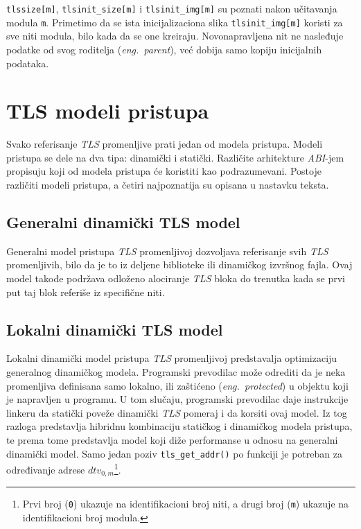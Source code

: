 \documentclass[12pt,oneside]{memoir}
\begin{document}
\texttt{tlssize[m]}, \texttt{tlsinit\_size[m]} i \texttt{tlsinit\_img[m]} su poznati nakon učitavanja modula \texttt{m}. Primetimo da se ista inicijalizaciona slika \texttt{tlsinit\_img[m]} koristi za sve niti modula, bilo kada da se one kreiraju. Novonapravljena nit ne nasleđuje podatke od svog roditelja (\emph{eng.~parent}), već dobija samo kopiju inicijalnih podataka.

\section{TLS modeli pristupa}
\label{sec:tlsmodeli}

Svako referisanje \emph{TLS} promenljive prati jedan od modela pristupa. Modeli pristupa se dele na dva tipa: dinamički i statički. Različite arhitekture \emph{ABI}-jem propisuju koji od modela pristupa će koristiti kao podrazumevani. Postoje različiti modeli pristupa, a četiri najpoznatija su opisana u nastavku teksta.

\subsection{Generalni dinamički TLS model}

Generalni model pristupa \emph{TLS} promenljivoj dozvoljava referisanje svih \emph{TLS} promenljivih, bilo da je to iz deljene biblioteke ili dinamičkog izvršnog fajla. Ovaj model takođe podržava odloženo alociranje \emph{TLS} bloka do trenutka kada se prvi put taj blok referiše iz specifične niti.

\subsection{Lokalni dinamički TLS model}

Lokalni dinamički model pristupa \emph{TLS} promenljivoj predstavalja optimizaciju generalnog dinamičkog modela. Programski prevodilac može odrediti da je neka promenljiva definisana samo lokalno, ili zaštićeno (\emph{eng.~protected}) u objektu koji je napravljen u programu. U tom slučaju, programski prevodilac daje instrukcije linkeru da statički poveže dinamički \emph{TLS} pomeraj i da korsiti ovaj model. Iz tog razloga predstavlja hibridnu kombinaciju statičkog i dinamičkog modela pristupa, te prema tome predstavlja model koji diže performanse u odnosu na generalni dinamički model. Samo jedan poziv \texttt{tls\_get\_addr()} po funkciji je potreban za određivanje adrese \texttt{$dtv_{0,m}$}\footnote{Prvi broj (\texttt{0}) ukazuje na identifikacioni broj niti, a drugi broj (\texttt{m}) ukazuje na identifikacioni broj modula.}.
\end{document}
